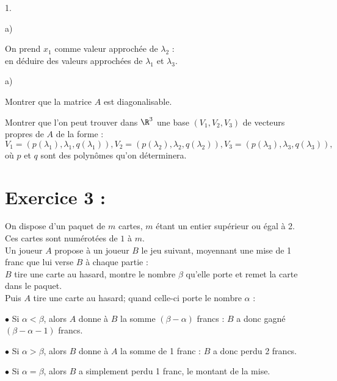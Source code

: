 \documentclass[11pt]{article}%
\begin{document}
\begin{noliste}{1.}
\begin{noliste}{a)}
\item On prend $x_{1}$ comme valeur approchée de $\lambda_{2}$ :\\
en déduire des valeurs approchées de $\lambda_{1}$ et $\lambda_{3}. $
\end{noliste}

\begin{noliste}{a)}
 \setlength{\itemsep}{2mm}
\item Montrer que la matrice $A$ est diagonalisable.

\item Montrer que l'on peut trouver dans $\R^{3}$ une base $\left(
V_{1},V_{2},V_{3}\right) $ de vecteurs propres de $A$ de la forme :
\[
V_{1} = \left( p\left( \lambda_{1}\right),\lambda_{1},q\left( \lambda
_{1}\right) \right),V_{2} = \left( p\left( \lambda_{2}\right),\lambda
_{2},q\left( \lambda_{2}\right) \right),V_{3} = \left( p\left( \lambda
_{3}\right),\lambda_{3},q\left( \lambda_{3}\right) \right),
\]
où $p$ et $q$ sont des polynômes qu'on déterminera.
\end{noliste}
\end{noliste}

\section*{\protect\Large Exercice 3 :}

On dispose d'un paquet de $m$ cartes, $m$ étant un entier supérieur ou
égal à
2. \\
Ces cartes sont numérotées de $1$ à $m.$\\
Un joueur $A$ propose à un joueur $B$ le jeu suivant, moyennant une
mise de
1 franc que lui verse $B$ à chaque partie :\\
$B$ tire une carte au hasard, montre le nombre $\beta $ qu'elle porte
et
remet la carte dans le paquet. \\
Puis $A$ tire une carte au hasard; quand celle-ci porte le nombre
$\alpha $ :

$\bullet $ Si $\alpha <\beta $, alors $A$ donne à $B$ la somme $\left(
\beta
-\alpha \right) $ francs : $B$ a donc gagné $\left( \beta -\alpha
-1\right) $
francs.

$\bullet $ Si $\alpha >\beta $, alors $B$ donne à $A$ la somme de 1
franc : $B$ a donc perdu 2 francs.

$\bullet $ Si $\alpha = \beta $, alors $B$ a simplement perdu 1 franc,
le
montant de la mise.
\end{document}
